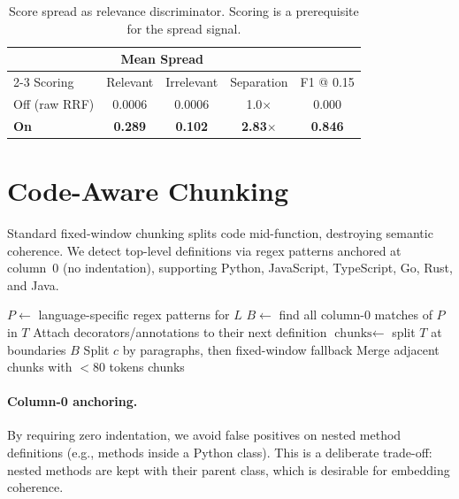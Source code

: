 \documentclass[11pt,a4paper]{article}
\begin{document}
\begin{table}[t]
  \centering
  \caption{Score spread as relevance discriminator.  Scoring is a
    prerequisite for the spread signal.}
  \label{tab:relevance}
  \begin{tabular}{lcccc}
    \toprule
    & \multicolumn{2}{c}{Mean Spread} & & \\
    \cmidrule(lr){2-3}
    Scoring & Relevant & Irrelevant & Separation & F1 @ 0.15 \\
    \midrule
    Off (raw RRF) & 0.0006 & 0.0006 & 1.0$\times$ & 0.000 \\
    \textbf{On} & \textbf{0.289} & \textbf{0.102} & \textbf{2.83$\times$} & \textbf{0.846} \\
    \bottomrule
  \end{tabular}
\end{table}


\section{Code-Aware Chunking}
\label{sec:chunking}

Standard fixed-window chunking splits code mid-function, destroying
semantic coherence.  We detect top-level definitions via regex patterns
anchored at column~0 (no indentation), supporting Python, JavaScript,
TypeScript, Go, Rust, and Java.

\begin{algorithm}[t]
  \caption{Code-Aware Chunking}
  \label{alg:chunking}
  \begin{algorithmic}[1]
    \State $P \gets$ language-specific regex patterns for $L$
    \State $B \gets$ find all column-0 matches of $P$ in $T$
    \State Attach decorators/annotations to their next definition
    \State $\text{chunks} \gets$ split $T$ at boundaries $B$
        \State Split $c$ by paragraphs, then fixed-window fallback
      \EndIf
    \EndFor
    \State Merge adjacent chunks with $< 80$ tokens
    \State \Return chunks
  \end{algorithmic}
\end{algorithm}

\paragraph{Column-0 anchoring.}  By requiring zero indentation, we
avoid false positives on nested method definitions (e.g., methods
inside a Python class).  This is a deliberate trade-off: nested
methods are kept with their parent class, which is desirable for
embedding coherence.
\end{document}
